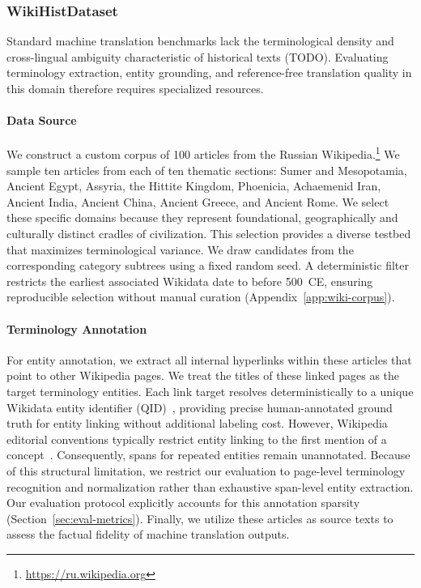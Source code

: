 \documentclass[11pt]{article}
\newcommand{\datasetWikipediaName}{WikiHist}
\begin{document}

\subsubsection{\datasetWikipediaName Dataset}

Standard machine translation benchmarks lack the terminological density and cross-lingual ambiguity characteristic of historical texts (TODO). Evaluating terminology extraction, entity grounding, and reference-free translation quality in this domain therefore requires specialized resources.
\paragraph{Data Source}
We construct a custom corpus of 100 articles from the Russian Wikipedia.\footnote{\url{https://ru.wikipedia.org}} We sample ten articles from each of ten thematic sections: Sumer and Mesopotamia, Ancient Egypt, Assyria, the Hittite Kingdom, Phoenicia, Achaemenid Iran, Ancient India, Ancient China, Ancient Greece, and Ancient Rome. We select these specific domains because they represent foundational, geographically and culturally distinct cradles of civilization. This selection provides a diverse testbed that maximizes terminological variance. We draw candidates from the corresponding category subtrees using a fixed random seed. A deterministic filter restricts the earliest associated Wikidata date to before 500~CE, ensuring reproducible selection without manual curation (Appendix~\ref{app:wiki-corpus}).
\paragraph{Terminology Annotation}
For entity annotation, we extract all internal hyperlinks within these articles that point to other Wikipedia pages. We treat the titles of these linked pages as the target terminology entities. Each link target resolves deterministically to a unique Wikidata entity identifier (QID)~\citep{vrandecic2014wikidata}, providing precise human-annotated ground truth for entity linking without additional labeling cost. However, Wikipedia editorial conventions typically restrict entity linking to the first mention of a concept~\citep{damuel2023}. Consequently, spans for repeated entities remain unannotated. Because of this structural limitation, we restrict our evaluation to page-level terminology recognition and normalization rather than exhaustive span-level entity extraction. Our evaluation protocol explicitly accounts for this annotation sparsity (Section~\ref{sec:eval-metrics}). Finally, we utilize these articles as source texts to assess the factual fidelity of machine translation outputs.
\end{document}
